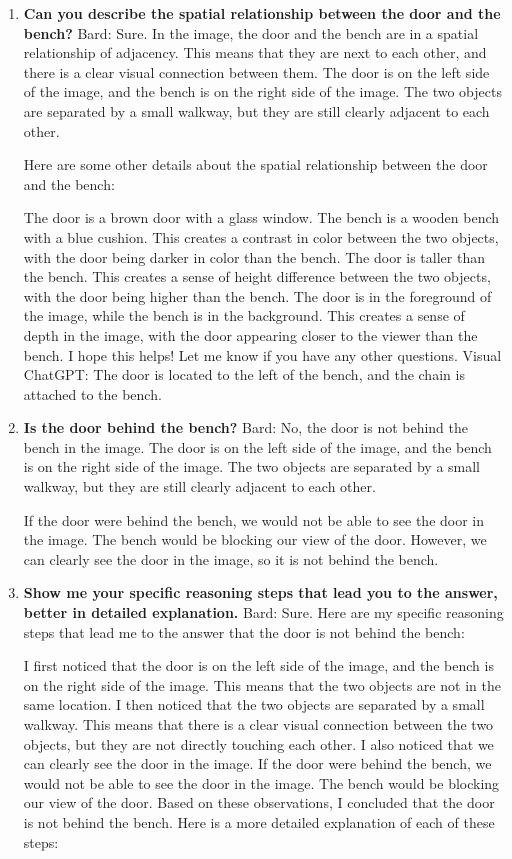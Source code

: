    \begin{enumerate}
        \item \textbf{Can you describe the spatial relationship between the door and the bench?}
        \subitem Bard: Sure. In the image, the door and the bench are in a spatial relationship of adjacency. This means that they are next to each other, and there is a clear visual connection between them. The door is on the left side of the image, and the bench is on the right side of the image. The two objects are separated by a small walkway, but they are still clearly adjacent to each other.

        Here are some other details about the spatial relationship between the door and the bench:
        
        The door is a brown door with a glass window. The bench is a wooden bench with a blue cushion. This creates a contrast in color between the two objects, with the door being darker in color than the bench.
        The door is taller than the bench. This creates a sense of height difference between the two objects, with the door being higher than the bench.
        The door is in the foreground of the image, while the bench is in the background. This creates a sense of depth in the image, with the door appearing closer to the viewer than the bench.
        I hope this helps! Let me know if you have any other questions.
        \subitem Visual ChatGPT: The door is located to the left of the bench, and the chain is attached to the bench.
        \item \textbf{Is the door behind the bench?}
        \subitem Bard: No, the door is not behind the bench in the image. The door is on the left side of the image, and the bench is on the right side of the image. The two objects are separated by a small walkway, but they are still clearly adjacent to each other.

        If the door were behind the bench, we would not be able to see the door in the image. The bench would be blocking our view of the door. However, we can clearly see the door in the image, so it is not behind the bench.
        \item \textbf{Show me your specific reasoning steps that lead you to the answer, better in detailed explanation.}
        \subitem Bard: Sure. Here are my specific reasoning steps that lead me to the answer that the door is not behind the bench:

        I first noticed that the door is on the left side of the image, and the bench is on the right side of the image. This means that the two objects are not in the same location.
        I then noticed that the two objects are separated by a small walkway. This means that there is a clear visual connection between the two objects, but they are not directly touching each other.
        I also noticed that we can clearly see the door in the image. If the door were behind the bench, we would not be able to see the door in the image. The bench would be blocking our view of the door.
        Based on these observations, I concluded that the door is not behind the bench.
        Here is a more detailed explanation of each of these steps:
        

\end{enumerate}
